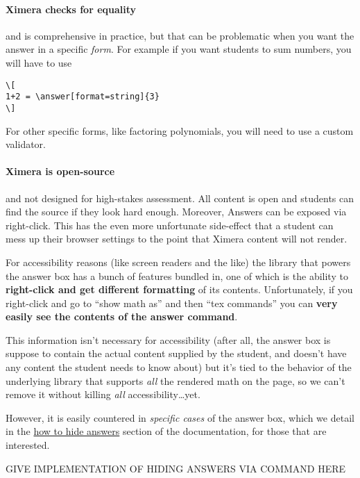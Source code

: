 \documentclass{ximera}
\begin{document}
\paragraph{Ximera checks for equality} and is comprehensive in
practice, but that can be problematic when you want the answer in a specific
\textit{form}. For example if you want students to sum numbers, you will have
to use
\begin{verbatim}
\[
1+2 = \answer[format=string]{3}
\]
\end{verbatim}
For other specific forms, like factoring polynomials, you will need to use a
custom validator.

\paragraph{Ximera is open-source} and not designed for high-stakes assessment. All content is
open and students can find the source if they look hard enough. Moreover,
Answers can be exposed via right-click. This has the even more unfortunate
side-effect that a student can mess up their browser settings to the point that
Ximera content will not render.

For accessibility reasons (like screen readers and the like) the library
that powers the answer box has a bunch of features bundled in, one of which is
the ability to \textbf{right-click and get different formatting} of its
contents.
Unfortunately, if you right-click and go to ``show math as'' and then ``tex
commands'' you can \textbf{very easily see the contents of the answer command}.

This information isn't necessary for accessibility
(after all, the answer box is suppose to contain the actual content supplied by
the student, and doesn't have any content the student needs to know about) but
it's tied to the behavior of the underlying library that supports \textit{all}
the rendered math on the page, so we can't remove it without killing
\textit{all} accessibility\dots yet.

However, it is easily countered in \textit{specific cases} of the answer box,
which we detail in the
\href{https://xronos.clas.ufl.edu/examples/exampleCore/supplemental/hiddenAnswers}{how
  to hide answers} section of the documentation, for those that are interested.

GIVE IMPLEMENTATION OF HIDING ANSWERS VIA COMMAND HERE
\end{document}
